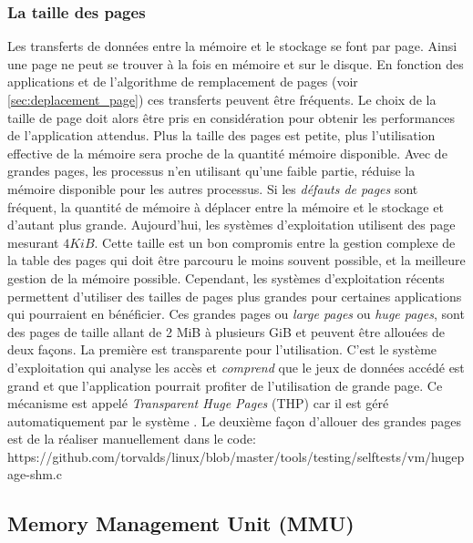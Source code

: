 \subsubsection{La taille des pages}
Les transferts de données entre la mémoire et le stockage se font par page. Ainsi une page ne peut se trouver à la fois en mémoire et sur le disque. En fonction des applications et de l'algorithme de remplacement de pages (voir \autoref{sec:deplacement_page}) ces transferts peuvent être fréquents. Le choix de la taille de page doit alors être pris en considération pour obtenir les performances de l'application attendus.
Plus la taille des pages est petite, plus l'utilisation effective de la mémoire sera proche de la quantité mémoire disponible. Avec de grandes pages, les processus n'en utilisant qu'une faible partie, réduise la mémoire disponible pour les autres processus. Si les \textit{défauts de pages} sont fréquent, la quantité de mémoire à déplacer entre la mémoire et le stockage et d'autant plus grande.
Aujourd'hui, les systèmes d'exploitation utilisent des page mesurant $4 KiB$. Cette taille est un bon compromis entre la gestion complexe de la table des pages qui doit être parcouru le moins souvent possible, et la meilleure gestion de la mémoire possible. 
Cependant, les systèmes d'exploitation récents permettent d'utiliser des tailles de pages plus grandes pour certaines applications qui pourraient en bénéficier. Ces grandes pages ou \textit{large pages} ou \textit{huge pages}, sont des pages de taille allant de 2 MiB à plusieurs GiB et peuvent être allouées de deux façons. La première est transparente pour l'utilisation. C'est le système d'exploitation qui analyse les accès et \textit{comprend} que le jeux de données accédé est grand et que l'application pourrait profiter de l'utilisation de grande page. Ce mécanisme est appelé \textit{Transparent Huge Pages} (THP) car il est géré automatiquement par le système \cite{TODO}. Le deuxième façon d'allouer des grandes pages est de la réaliser manuellement dans le code:
https://github.com/torvalds/linux/blob/master/tools/testing/selftests/vm/hugepage-shm.c








\subsection{Memory Management Unit (MMU)} \label{sec:mmu}




